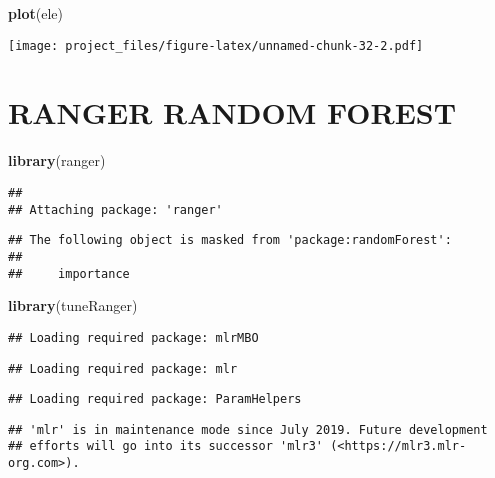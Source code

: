 \documentclass[
]{article}
\newenvironment{Shaded}{\begin{snugshade}}{\end{snugshade}}
\newcommand{\KeywordTok}[1]{\textcolor[rgb]{0.13,0.29,0.53}{\textbf{#1}}}
\newcommand{\NormalTok}[1]{#1}
\begin{document}
\begin{Shaded}
\begin{Highlighting}[]
\KeywordTok{plot}\NormalTok{(ele)}
\end{Highlighting}
\end{Shaded}

\texttt{[image: project\_files/figure-latex/unnamed-chunk-32-2.pdf]}

\hypertarget{ranger-random-forest}{%
\section{RANGER RANDOM FOREST}\label{ranger-random-forest}}

\begin{Shaded}
\begin{Highlighting}[]
\KeywordTok{library}\NormalTok{(ranger)}
\end{Highlighting}
\end{Shaded}

\begin{verbatim}
## 
## Attaching package: 'ranger'
\end{verbatim}

\begin{verbatim}
## The following object is masked from 'package:randomForest':
## 
##     importance
\end{verbatim}

\begin{Shaded}
\begin{Highlighting}[]
\KeywordTok{library}\NormalTok{(tuneRanger)}
\end{Highlighting}
\end{Shaded}

\begin{verbatim}
## Loading required package: mlrMBO
\end{verbatim}

\begin{verbatim}
## Loading required package: mlr
\end{verbatim}

\begin{verbatim}
## Loading required package: ParamHelpers
\end{verbatim}

\begin{verbatim}
## 'mlr' is in maintenance mode since July 2019. Future development
## efforts will go into its successor 'mlr3' (<https://mlr3.mlr-org.com>).
\end{verbatim}
\end{document}
